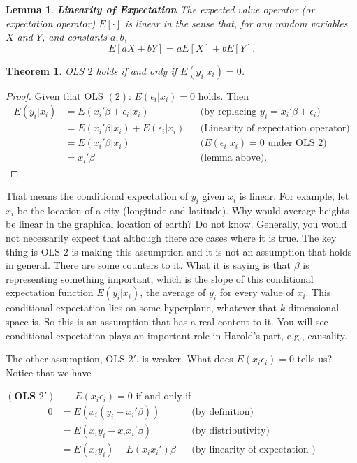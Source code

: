 \documentclass[11pt,a4paper]{amsart}
\theoremstyle{plain}
\newtheorem{theorem}{Theorem}
\newtheorem{lemma}{Lemma}
\theoremstyle{definition}
\begin{document}
	\begin{lemma}
		\textbf{Linearity of Expectation} The expected value operator (or expectation operator) $E[\cdot]$ is linear in the sense that, for any random variables $X$ and $Y$, and constants $a, b$, 
		\[	E[aX + bY] = aE[X] + bE[Y].	\]
	\end{lemma}

	\begin{theorem}\label{ols2 beta}
		OLS $2$ holds if and only if $E(y_{i} | x_{i}) = 0$.
	\end{theorem}
	\begin{proof}
		Given that OLS $(2)$: $E(\epsilon_{i} | x_{i}) = 0$ holds. Then \begin{align*}
			E(y_{i} | x_{i}) &= E(x_{i}' \beta + \epsilon_{i} | x_{i}) &&\text{(by replacing $y_{i} = x_{i}' \beta + \epsilon_{i}$)} \\
			&= E(x_{i}' \beta | x_{i}) + E(\epsilon_{i} | x_{i})  &&\text{(Linearity of expectation operator)} \\
			&= E(x_{i}' \beta | x_{i}) &&\text{($E(\epsilon_{i} | x_{i})  = 0$ under OLS $2$)} \\
			&= x_{i}' \beta  &&\text{(lemma above)}. 
		\end{align*}
	\end{proof}
	 That means the conditional expectation of $y_{i}$ given $x_{i}$ is linear. For example, let $x_{i}$ be the location of a city (longitude and latitude). Why would average heights be linear in the graphical location of earth? Do not know. Generally, you would not necessarily expect that although there are cases where it is true.  The key thing is OLS $2$ is making this assumption and it is not an assumption that holds in general. There are some counters to it. What it is saying is that $\beta$ is representing something important, which is the slope of this conditional expectation function $E(y_{i} | x_{i})$, the average of $y_{i}$ for every value of $x_{i}$. This conditional expectation lies on some hyperplane, whatever that $k$ dimensional space is. So this is an assumption that has a real content to it. You will see conditional expectation plays an important role in Harold's part, e.g., causality.\par 
	 The other assumption, OLS $2'$. is weaker. What does $E(x_{i} \epsilon_{i} ) = 0$ tells us? Notice that we have\par 
	 $(\textbf{OLS $2'$})  \qquad E(x_{i} \epsilon_{i}) = 0$ if and only if 
	 \begin{align*}
	 	 0 &= E(x_{i} (y_{i}-x_{i}' \beta))	&&\text{(by definition)} \\
	 	&= E(x_{i}y_{i}-x_{i} x_{i}' \beta) 	&&\text{(by distributivity)} \\
	 	&= E(x_{i}y_{i})-  E(x_{i} x_{i}')\beta 	&&\text{(by linearity of expectation )}
	 \end{align*}
\end{document}
